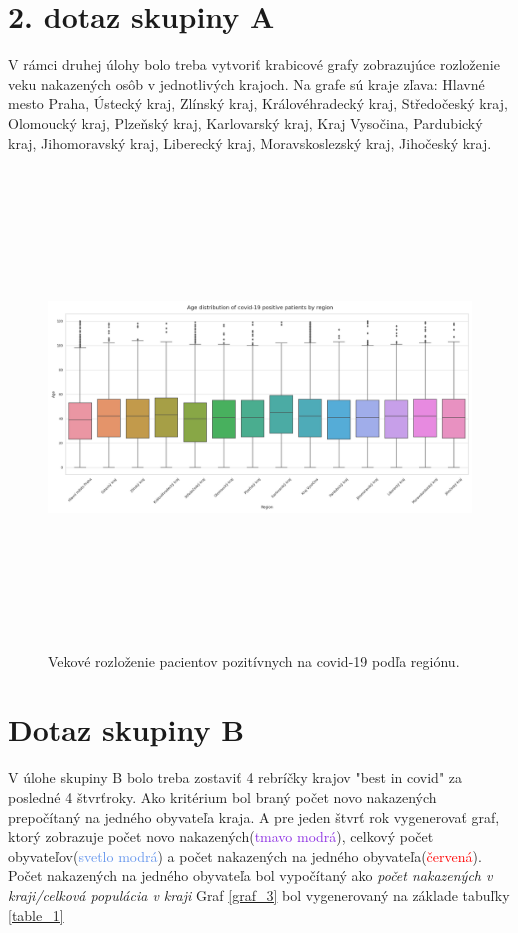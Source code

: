 \documentclass[a4paper, 16pt]{article}
\begin{document}
\newpage
\section{2. dotaz skupiny A}

V rámci druhej úlohy bolo treba vytvoriť krabicové grafy zobrazujúce rozloženie veku nakazených osôb v jednotlivých krajoch. Na grafe sú kraje zľava: Hlavné mesto Praha, Ústecký kraj, Zlínský kraj, Královéhradecký kraj, Středočeský kraj, Olomoucký kraj, Plzeňský kraj, Karlovarský kraj, Kraj Vysočina, Pardubický kraj, Jihomoravský kraj, Liberecký kraj, Moravskoslezský kraj, Jihočeský kraj.
\begin{figure}[H] \centering
    \includegraphics[width=\linewidth,height=5in]{Q2.png}
    \caption{Vekové rozloženie pacientov pozitívnych na covid-19 podľa regiónu.}
    \label{graf_2}
\end{figure}

\newpage
\section{Dotaz skupiny B}

V úlohe skupiny B bolo treba zostaviť 4 rebríčky krajov "best in covid" za posledné 4 štvrťroky. Ako kritérium bol braný počet novo nakazených prepočítaný na jedného obyvateľa kraja. A pre jeden štvrť rok vygenerovať graf, ktorý zobrazuje počet novo nakazených(\textcolor{BlueViolet}{tmavo modrá}), celkový počet obyvateľov(\textcolor{CornflowerBlue}{svetlo modrá}) a počet nakazených na jedného obyvateľa(\textcolor{red}{červená}). Počet nakazených na jedného obyvateľa bol vypočítaný ako \textit{počet nakazených v kraji/celková populácia v kraji} Graf \ref{graf_3} bol vygenerovaný na základe tabuľky \ref{table_1}
\end{document}
